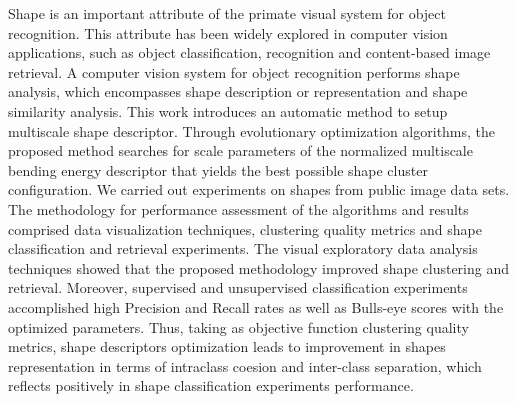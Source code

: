\begin{comment}
 Shape is an important atribute of the primate visual system for object recognition. This atribute has been widely explored in computer vision applications, such as object classification, recognition and content-based image retrieval. A computer vision system for object recognition performs shape analysis, which encompasses shape description or representation and shape similarity analysis. In this work, we investigate the use of information theory concepts in shape analysis and thus, we propose a new methodology for shape analysis which relies on the multiscale bending energy and the concept of differential entropy. We also apply divergence measures to evaluate shapes similarity based on histograms of its contour signatures.
Moreover, we introduced an evolutionary optimization methodology for parameter adjustment of multiscale shape descriptors. 
We carried out experiments on shapes from public image data sets. The methodology for performance assessment of the algorithms and results comprised data visualization techniques, clustering quality evaluation measures and shape classification and retrieval experiments. 
The visual exploratory data analysis techniques showed that the proposed methodology for parameter adjustment of shape descriptors  improved shape clustering and retrieval. Moreover, unsupervised classification experiments accomplished high Precision and Recall rates as well as Bulls-eye scores with the optimized parameters.  Finally, the results led us to conclude that information theory concepts are suitable for shape and similarity analysis. 
\end{comment}


Shape is an important attribute of the primate visual system for object recognition. This attribute has been widely explored in computer vision applications, such as object classification, recognition and content-based image retrieval. A computer vision system for object recognition performs shape analysis, which encompasses shape description or representation and shape similarity analysis. This work introduces an automatic method to setup multiscale shape descriptor. Through evolutionary optimization algorithms, the proposed method searches for scale parameters of the normalized multiscale bending energy descriptor that yields the best possible shape cluster configuration. We carried out experiments on shapes from public image data sets. The methodology for performance assessment of the algorithms and results comprised data visualization techniques, clustering quality metrics and shape classification and retrieval experiments. The visual exploratory data analysis techniques showed that the proposed methodology improved shape clustering and retrieval. Moreover, supervised and unsupervised classification experiments accomplished high Precision and Recall rates as well as Bulls-eye scores with the optimized parameters. Thus, taking as objective function clustering quality metrics, shape descriptors optimization leads to improvement in shapes representation in terms of intraclass coesion and inter-class separation, which reflects positively in shape classification experiments performance.    

